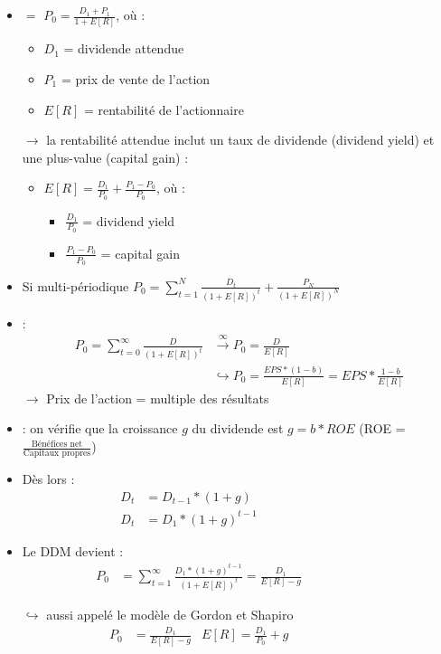 \begin{itemize}
    \item {} $=$ $P_0 = \frac{D_1 + P_1}{1 + E[R]}$, où :
    \begin{itemize}
        \item $D_1$ = dividende attendue
        \item $P_1$ = prix de vente de l'action
        \item $E[R]$ = rentabilité de l'actionnaire
    \end{itemize}
    \item[$\rightarrow$] la rentabilité attendue inclut un taux de dividende (dividend yield) et une plus-value (capital gain) :
    \begin{itemize}
        \item $E[R] = \frac{D_1}{P_0} + \frac{P_1 - P_0}{P_0}$, où :
        \begin{itemize}
            \item $\frac{D_1}{P_0}$ = dividend yield
            \item $\frac{P_1 - P_0}{P_0}$ = capital gain
        \end{itemize}
    \end{itemize}
    \item Si multi-périodique $P_0 = \sum_{t=1}^N \frac{D_t}{(1 + E[R])^t} + \frac{P_N}{(1 + E[R])^N}$
    \item {} :
    \begin{align*}
       P_0 = \sum_{t=0}^{\infty} \frac{D}{(1 + E[R])^t} &\xrightarrow{\infty} P_0 = \frac{D}{E[R]} \\
         &\hookrightarrow P_0 = \frac{EPS * (1-b)}{E[R]} = EPS * \frac{1-b}{E[R]}
    \end{align*}
    $\rightarrow$ Prix de l'action = multiple des résultats
    \item {} : on vérifie que la croissance $g$ du dividende est $g = b * ROE$ (ROE = $\frac{\text{Bénéfices net}}{\text{Capitaux propres}}$)
    \item Dès lors :
    \begin{align*}
        D_t &= D_{t-1} * (1 + g) &&&&&&&&&&\\
        D_t &= D_1 * (1+g)^{t-1} &&&&&&&&&&
    \end{align*}
    \item Le DDM devient :
    \begin{align*}
        P_0 &= \sum^{\infty}_{t=1} \frac{D_1 * (1+g)^{t-1}}{(1+E[R])^t} = \frac{D_1}{E[R] - g} &&&&&&&&
    \end{align*}
    \item[$\hookrightarrow$] aussi appelé le modèle de Gordon et Shapiro
    \begin{align*}
        P_0 &= \frac{D_1}{E[R] - g} & E[R] = \frac{D_1}{P_0} + g &&&&&&&&
    \end{align*}
\end{itemize}
